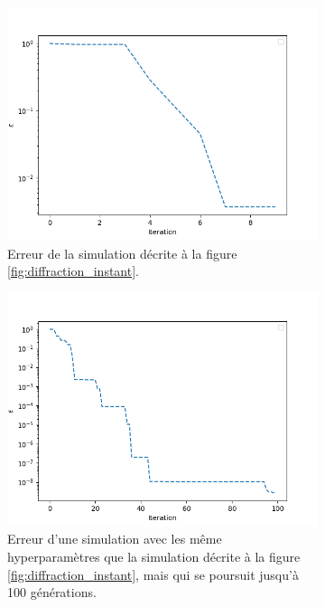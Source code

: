 \documentclass{article}
\begin{document}
\begin{figure}[H]
	\centering
	\begin{subfigure}{.46\linewidth}
		\centering
		\includegraphics[scale=0.46]{imgs/validation/validation.png}
		\caption{Erreur de la simulation décrite à la figure \ref{fig:diffraction_instant}. }
	\end{subfigure}
	\hspace{0.5cm}
	\begin{subfigure}{.46\linewidth}
		\centering
		\includegraphics[scale=0.46]{imgs/validation/validation_log.png}
		\caption{Erreur d'une simulation avec les même hyperparamètres que la simulation décrite à la figure \ref{fig:diffraction_instant}, mais qui se poursuit jusqu'à 100 générations.}
	\end{subfigure}
	\caption{}
	\label{fig:diffraction_error}
\end{figure}
\end{document}

